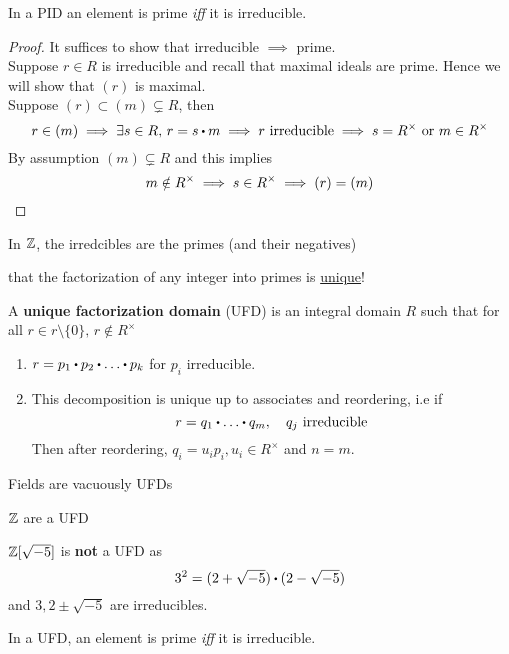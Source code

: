 \documentclass[../Main.tex]{subfiles}
\begin{document}
\begin{prop}[title = Element in PID is prime iff it is irreducible]
	In a PID an element is prime \textit{iff} it is irreducible.
\end{prop}
\begin{proof}
	It suffices to show that irreducible $\implies$ prime.\\
	Suppose $r\in R$ is irreducible and recall that maximal ideals are prime. Hence we will show that $(r)$ is maximal.\\
	Suppose $(r)\subset (m)\subsetneq R$, then
	\[r\in (m) \implies \exists s\in R,\, r=s\rdot m\implies r \text{ irreducible} \implies s=R^\times \text{ or } m\in R^\times\]
	By assumption $(m)\subsetneq R$ and this implies
	\[m\notin R^\times \implies s\in R^\times \implies (r) = (m)\qedhere\]
\end{proof}
\begin{example}
	In $\mathbb{Z}$, the irredcibles are the primes (and their negatives)
\end{example}
\Obs that the factorization of any integer into primes is \underline{unique}!
\begin{dfn}[title = Unique Factorization Domain]
	A \textbf{unique factorization domain} (UFD) is an integral domain $R$ such that for all $r\in r\setminus \{0\},\, r\notin R^\times$
	\begin{enumerate}
		\item $r=p_1\rdot p_2\rdot \dots\rdot p_k$ for $p_i$ irreducible.
		\item This decomposition is unique up to associates and reordering, i.e if 
		\[r=q_1\rdot \dots \rdot q_m,\quad q_j \text{ irreducible}\]
		Then after reordering, $q_i=u_ip_i, u_i\in R^\times$ and $n=m$.
	\end{enumerate}
\end{dfn}
\begin{example}
	Fields are vacuously UFDs
\end{example}
\begin{example}
	$\mathbb{Z}$ are a UFD
\end{example}
\begin{example}
	$\mathbb{Z}[\sqrt{-5}]$ is \textbf{not} a UFD as
	\[3^2=(2+\sqrt{-5})\rdot (2-\sqrt{-5})\]
	and $3,2\pm \sqrt{-5}$ are irreducibles.
\end{example}
\begin{prop}[title = Element in UFD is prime iff it is irreducible]
	In a UFD, an element is prime \textit{iff} it is irreducible.
\end{prop}
\end{document}
